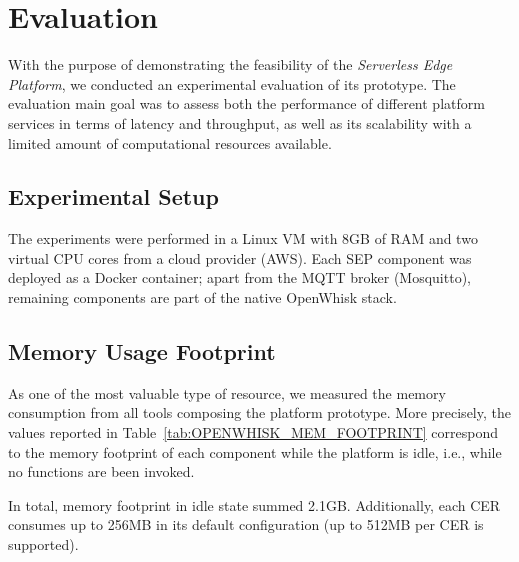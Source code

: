 \section{Evaluation}\label{sec:evaluation}

With the purpose of demonstrating the feasibility of the \textit{Serverless Edge Platform}, we conducted an experimental evaluation of its prototype. The evaluation main goal was to assess both the performance of different platform services in terms of latency and throughput, as well as its scalability with a limited amount of computational resources available. 

\subsection{Experimental Setup}

The experiments were performed in a Linux VM with 8GB of RAM and two virtual CPU cores from a cloud provider (AWS). Each SEP component was deployed as a Docker container; apart from the MQTT broker (Mosquitto), remaining components are part of the native OpenWhisk stack.  

\subsection{Memory Usage Footprint}

As one of the most valuable type of resource, we measured the memory consumption from all tools composing the platform prototype. More precisely, the values reported in Table~\ref{tab:OPENWHISK_MEM_FOOTPRINT} correspond to the memory footprint of each component while the platform is idle, i.e., while no functions are been invoked.

In total, memory footprint in idle state summed  2.1GB. Additionally, each CER consumes up to 256MB in its default configuration (up to 512MB per CER is supported). 


